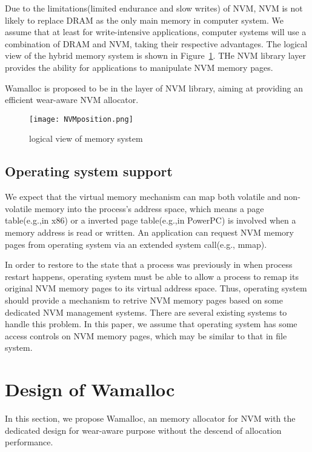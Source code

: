 \documentclass[10pt, conference, compsocconf]{IEEEtran}
\begin{document}
Due to the limitations(limited endurance and slow writes) of NVM,
NVM is not likely to replace DRAM as the only main memory in computer system.
We assume that at least for write-intensive applications,
computer systems will use a combination of DRAM and NVM, taking their respective advantages.
The logical view of the hybrid memory system is shown in Figure~\ref{fig:NVMposition}.
THe NVM library layer provides the ability for applications to manipulate NVM memory pages.

Wamalloc is proposed to be in the layer of NVM library, aiming at providing an efficient wear-aware NVM allocator.

\begin{figure}[h]
\centering
\texttt{[image: NVMposition.png]}
\caption{logical view of memory system}
\label{fig:NVMposition}
\end{figure}

\subsection{Operating system support}

We expect that the virtual memory mechanism can map both volatile and non-volatile memory into the process's address space,
which means a page table(e.g.,in x86) or a inverted page table(e.g.,in PowerPC) is involved when a memory address is read or written.
An application can request NVM memory pages from operating system via an extended system call(e.g., mmap).

In order to restore to the state that a process was previously in when process restart happens, 
operating system must be able to allow a process to remap its original NVM memory pages to its virtual address space.
Thus, operating system should provide a mechanism to retrive NVM memory pages based on some dedicated NVM management systems.
There are several existing systems to handle this problem\cite{coburn2011nv, satyanarayanan1994lightweight, volos2011mnemosyne}.
In this paper, we assume that operating system has some access controls on NVM memory pages, 
which may be similar to that in file system.

\section{Design of Wamalloc}

In this section, we propose Wamalloc, 
an memory allocator for NVM with the dedicated design for wear-aware purpose 
without the descend of allocation performance.
\end{document}
